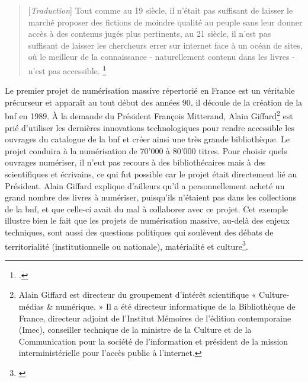 \begin{quotation}
[\textit{Traduction}]
Tout comme au 19 siècle, il n'était pas suffisant de laisser le marché proposer des fictions de moindre qualité au peuple sans leur donner accès à des contenus jugés plus pertinents, au 21 siècle, il n'est pas suffisant de laisser les chercheurs errer sur internet face à un océan de sites, où le meilleur de la connaissance - naturellement contenu dans les livres - n'est pas accessible.
\footnote{\cite[p.254]{jones_public_2017}.}
\end{quotation}

Le premier projet de numérisation massive répertorié en France est un véritable précurseur et apparaît au tout début des années 90, il découle de la création de la \gls{bnf} en 1989. À la demande du Président François Mitterand, Alain Giffard\footnote{Alain Giffard est directeur du groupement d’intérêt scientifique « Culture-médias \& numérique. » Il a été directeur informatique de la Bibliothèque de France, directeur adjoint de l’Institut Mémoires de l’édition contemporaine (Imec), conseiller technique de la ministre de la Culture et de la Communication pour la société de l’information et président de la mission interministérielle pour l’accès public à l’internet.} est prié d'utiliser les dernières innovations technologiques pour rendre accessible les ouvrages du catalogue de la \gls{bnf} et créer ainsi une très grande bibliothèque. Le projet conduira à la numérisation de 70'000 à 80'000 titres. Pour choisir quels ouvrages numériser, il n'eut pas recours à des bibliothécaires mais à des scientifiques et écrivains, ce qui fut possible car le projet était directement lié au Président. Alain Giffard explique d'ailleurs qu'il a personnellement acheté un grand nombre des livres à numériser, puisqu'ils n'étaient pas dans les collections de la \gls{bnf}, et que celle-ci avait du mal à collaborer avec ce projet. Cet exemple illustre bien le fait que les projets de numérisation massive, au-delà des enjeux techniques, sont aussi des questions politiques qui soulèvent des débats de territorialité (institutionnelle ou nationale), matérialité et culture\footnote{\cite[p.11]{thylstrup_politics_2018}}.  

